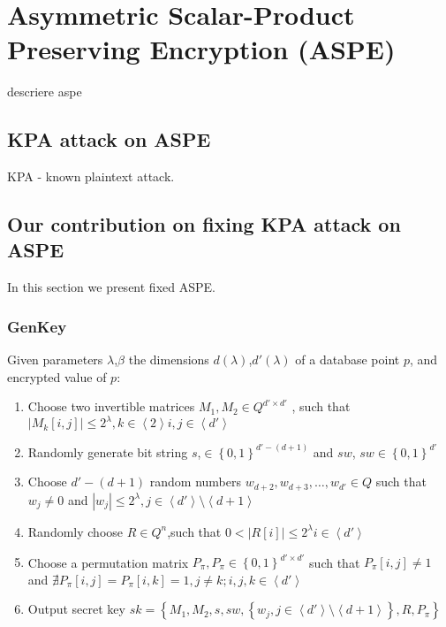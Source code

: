\documentclass[12pt,english,hidelinks]{article}
\begin{document}
\section{Asymmetric Scalar-Product Preserving Encryption (ASPE)}
descriere aspe
\subsection{KPA attack on ASPE}
KPA - known plaintext attack.
\subsection{Our contribution on fixing KPA attack on ASPE}
In this section we present fixed ASPE.
\subsubsection{GenKey}
Given parameters $\lambda$,$\beta$ the dimensions $d(\lambda)$,$d'(\lambda)$ of a database point $p$, and encrypted value of $p$:

\begin{enumerate}
  \item Choose two invertible matrices $M_{1},M_{2}\in Q^{d' \times d'}$ , such that $\left |M_{k}\left [ i,j \right ]  \right | \leq 2^{\lambda} , k \in \left \langle2 \right \rangle i,j \in \left \langle d' \right \rangle $
  
  \item Randomly generate bit string $s$,$\in \left \{ 0,1\right \}^{d'-(d+1)}$ and $sw$, $sw \in \left \{ 0,1\right \}^{d'}$ 
  \item Choose $d' - \left ( d+1 \right )$ random numbers $w_{d+2},w_{d+3}, \ldots ,w_{d'} \in Q$ such that $w_{j} \ne 0$ and $\left | w_{j} \right | \leq 2^{\lambda},j \in \left \langle d' \right \rangle \setminus  \left \langle d+1 \right \rangle$
  
\item Randomly choose $R \in Q^{n}$,such that $0<\left | R\left [ i \right ]  \right | \leq 2^\lambda i \in \left \langle d' \right \rangle$ 
\item Choose a permutation matrix $P_{\pi},P_{\pi} \in \left\{0,1\right\}^{d' \times d'}$ 
such that $P_{\pi}\left[i,j\right] \neq 1$ and $\nexists P_{\pi}\left[i,j\right] =P_{\pi}\left[i,k\right] = 1, j\neq k ;i,j,k\in \left \langle d'\right \rangle$
\item Output secret key $sk = \left \{ M_{1} ,M_{2} ,s ,sw ,\left \{ w_{j},j \in \left \langle d' \right \rangle \setminus \left \langle d+1 \right \rangle \right \},R,P_{\pi} \right  \}$
\end{enumerate}
\end{document}
